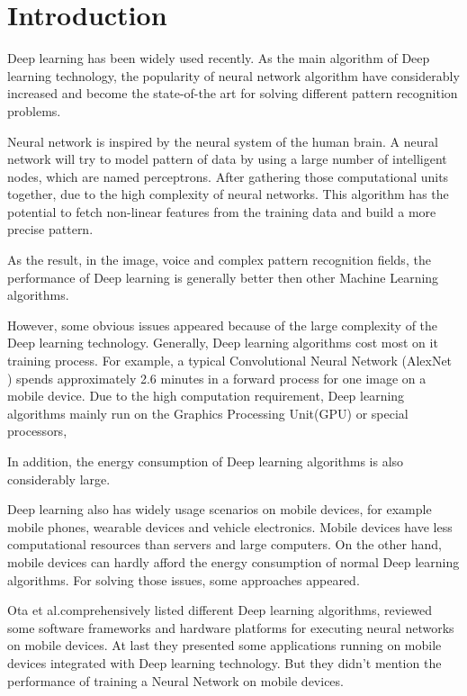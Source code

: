 \documentclass[article]{aaltoseries}
\begin{document}


\section{Introduction}


Deep learning has been widely used recently. As the main algorithm of Deep learning technology,
 the popularity of neural network algorithm 
 have considerably increased and become the state-of-the art for solving different pattern recognition
problems.

Neural network is inspired by the neural system of the human brain. A neural network will 
try to model pattern of data by using a large number of intelligent nodes, which are named perceptrons. 
After gathering those computational units together, due to the high complexity of neural networks. 
This algorithm has the potential to fetch non-linear features from the training data 
and build a more precise pattern.

As the result, in the image, voice and complex pattern recognition fields, the performance of Deep learning
is generally better then other Machine Learning algorithms.  

However, some obvious issues appeared because of the large complexity of the Deep learning technology. 
Generally, Deep learning algorithms cost most on it training process. 
For example, a typical Convolutional Neural Network (AlexNet \cite{NIPS2012_4824}) 
spends approximately 2.6 minutes in a forward process for one image on a mobile device.  %
Due to the high computation requirement, Deep learning algorithms mainly run on the Graphics Processing Unit(GPU) or special processors, 

In addition, the energy consumption of Deep learning algorithms is also considerably large. %

Deep learning also has widely usage scenarios on mobile devices, for example mobile phones, 
wearable devices and vehicle electronics. Mobile devices have less computational resources than 
servers and large computers. On the other hand, mobile devices can hardly afford the energy consumption
of normal Deep learning algorithms. For solving those issues, some approaches appeared.

Ota et al.\cite{Ota:2017}comprehensively listed different Deep learning algorithms,
reviewed some software frameworks and hardware platforms for executing neural networks on mobile devices.
At last they presented some applications running on mobile devices integrated with Deep learning technology. 
But they didn't mention the performance of training a Neural Network on mobile devices. 
\end{document}
